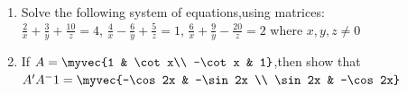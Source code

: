 \begin{enumerate}
\begin{enumerate}
			\item Both Assertion and Reason are true, but Reason is not the correct explaination of Assertion.
			\item Assertion is true, but Reason is false.
			\item Assertion is false, but Reason is true.
		\end{enumerate}
	\item Solve the following system of equations,using matrices:\\
		$\frac{2}{x} + \frac{3}{y} + \frac{10}{z}  = 4$, $\frac{4}{x} - \frac{6}{y}  + \frac{5}{z} =1$, $\frac{6}{x} + \frac{9}{y} - \frac{20}{z} = 2$ where $x,y,z \neq 0$\\
	\item If $A= \myvec{1 & \cot x\\ -\cot x & 1}$,then show that $A'A^-1= \myvec{-\cos 2x & -\sin 2x \\ \sin 2x & -\cos 2x}$
\end{enumerate}

